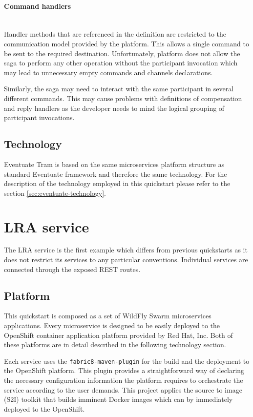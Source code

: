 \documentclass[oneside,
  digital, %
  table,   %
  nolof,     %
  nolot,     %
]{fithesis3}
\newcommand{\newlinepar}[1]{\paragraph{#1}\needspace{4\baselineskip}\mbox{}\\}
\begin{document}
\newlinepar{Command handlers}

Handler methods that are referenced in the definition are restricted to the communication model provided by the platform. This allows a single command to be sent to the required destination. Unfortunately, platform does not allow the saga to perform any other operation without the participant invocation which may lead to unnecessary empty commands and channels declarations. 

Similarly, the saga may need to interact with the same participant in several different commands. This may cause problems with definitions of compensation and reply handlers as the developer needs to mind the logical grouping of participant invocations.

\subsection{Technology}

Eventuate Tram is based on the same microservices platform structure as standard Eventuate framework and therefore the same technology. For the description of the technology employed in this quickstart please refer to the section \ref{sec:eventuate-technology}.

\section{LRA service}

The LRA service is the first example which differs from previous quickstarts as it does not restrict its services to any particular conventions. Individual services are connected through the exposed REST routes.

\subsection{Platform}

This quickstart is composed as a set of WildFly Swarm microservices applications. Every microservice is designed to be easily deployed to the OpenShift container application platform provided by Red Hat, Inc. \cite{openshift} Both of these platforms are in detail described in the following technology section.

Each service uses the \texttt{fabric8-maven-plugin} for the build and the deployment to the OpenShift platform. This plugin provides a straightforward way of declaring the necessary configuration information the platform requires to orchestrate the service according to the user demands. This project applies the source to image (S2I) toolkit that builds imminent Docker images which can by immediately deployed to the OpenShift. 
\end{document}
